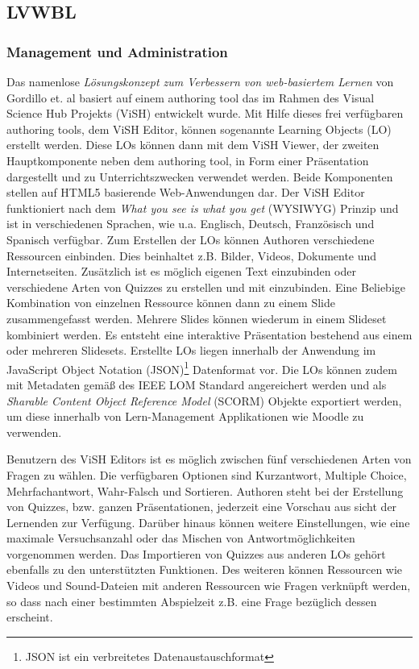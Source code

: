\documentclass[conference]{IEEEtran}
\begin{document}
\subsection{LVWBL}
\subsubsection{Management und Administration}
Das namenlose \emph{Lösungskonzept zum Verbessern von web-basiertem Lernen} von Gordillo et. al basiert auf einem authoring tool das im Rahmen des Visual Science Hub Projekts (ViSH) \cite{Barra2014} entwickelt wurde. Mit Hilfe dieses frei verfügbaren authoring tools, dem ViSH Editor, können sogenannte Learning Objects (LO) erstellt werden. Diese LOs können dann mit dem ViSH Viewer, der zweiten Hauptkomponente neben dem authoring tool, in Form einer Präsentation dargestellt und zu Unterrichtszwecken verwendet werden. Beide Komponenten stellen auf HTML5 basierende Web-Anwendungen dar. Der ViSH Editor funktioniert nach dem \emph{What you see is what you get} (WYSIWYG) Prinzip und ist in verschiedenen Sprachen, wie u.a. Englisch, Deutsch, Französisch und Spanisch verfügbar. Zum Erstellen der LOs können Authoren verschiedene Ressourcen einbinden. Dies beinhaltet z.B. Bilder, Videos, Dokumente und Internetseiten. Zusätzlich ist es möglich eigenen Text einzubinden oder verschiedene Arten von Quizzes zu erstellen und mit einzubinden. Eine Beliebige Kombination von einzelnen Ressource können dann zu einem Slide zusammengefasst werden. Mehrere Slides können wiederum in einem Slideset kombiniert werden. Es entsteht eine interaktive Präsentation bestehend aus einem oder mehreren Slidesets. Erstellte LOs liegen innerhalb der Anwendung im JavaScript Object Notation (JSON)\footnote{JSON ist ein verbreitetes Datenaustauschformat} Datenformat vor. Die LOs können zudem mit Metadaten gemäß des IEEE LOM Standard angereichert werden und als \emph{Sharable Content Object Reference Model} (SCORM) Objekte exportiert werden, um diese innerhalb von Lern-Management Applikationen wie Moodle zu verwenden. \cite[p. 3]{Gordillo2015}

Benutzern des ViSH Editors ist es möglich zwischen fünf verschiedenen Arten von Fragen zu wählen. Die verfügbaren Optionen sind Kurzantwort, Multiple Choice, Mehrfachantwort, Wahr-Falsch und Sortieren. Authoren steht bei der Erstellung von Quizzes, bzw. ganzen Präsentationen, jederzeit eine Vorschau aus sicht der Lernenden zur Verfügung. Darüber hinaus können weitere Einstellungen, wie eine maximale Versuchsanzahl oder das Mischen von Antwortmöglichkeiten vorgenommen werden. Das Importieren von Quizzes aus anderen LOs gehört ebenfalls zu den unterstützten Funktionen. Des weiteren können Ressourcen wie Videos und Sound-Dateien mit anderen Ressourcen wie Fragen verknüpft werden, so dass nach einer bestimmten Abspielzeit z.B. eine Frage bezüglich dessen erscheint. \cite[p. 3f]{Gordillo2015}
\end{document}

